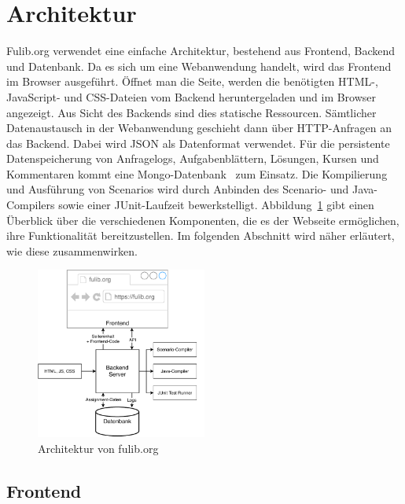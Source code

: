 \section{Architektur}\label{sec:architecture}

Fulib.org verwendet eine einfache Architektur, bestehend aus Frontend, Backend und Datenbank.
Da es sich um eine Webanwendung handelt, wird das Frontend im Browser ausgeführt.
Öffnet man die Seite, werden die benötigten HTML-, JavaScript- und CSS-Dateien vom Backend heruntergeladen und im Browser angezeigt.
Aus Sicht des Backends sind dies statische Ressourcen.
Sämtlicher Datenaustausch in der Webanwendung geschieht dann über HTTP-Anfragen an das Backend.
Dabei wird JSON als Datenformat verwendet.
Für die persistente Datenspeicherung von Anfragelogs, Aufgabenblättern, Lösungen, Kursen und Kommentaren kommt eine Mongo-Datenbank~\cite{mongodb} zum Einsatz.
Die Kompilierung und Ausführung von Scenarios wird durch Anbinden des Scenario- und Java-Compilers sowie einer JUnit-Laufzeit bewerkstelligt.
Abbildung~\ref{fig:website-architecture} gibt einen Überblick über die verschiedenen Komponenten, die es der Webseite ermöglichen, ihre Funktionalität bereitzustellen.
Im folgenden Abschnitt wird näher erläutert, wie diese zusammenwirken.

\begin{figure}
    \centering
    \includegraphics[width=0.5\textwidth]{chapter/fulib.org/img/architecture.pdf}
    \caption{Architektur von fulib.org}
    \label{fig:website-architecture}
\end{figure}

\subsection{Frontend}\label{subsec:frontend}

